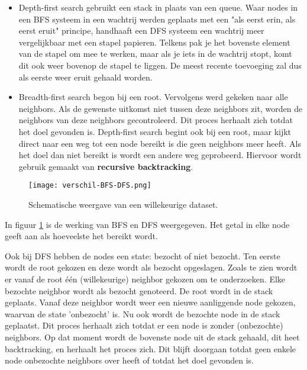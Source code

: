 \begin{itemize}
\item Depth-first search gebruikt een stack in plaats van een queue. Waar nodes in een BFS systeem in een wachtrij werden geplaats met een "als eerst erin, als eerst eruit" principe, handhaaft een DFS systeem een wachtrij meer vergelijkbaar met een stapel papieren. Telkens pak je het bovenste element van de stapel om mee te werken, maar als je iets in de wachtrij stopt, komt dit ook weer bovenop de stapel te liggen. De meest recente toevoeging zal dus als eerste weer eruit gehaald worden.
\item Breadth-first search begon bij een root. Vervolgens werd gekeken naar alle neighbors. Als de gewenste uitkomst niet tussen deze neighbors zit, worden de neighbors van deze neighbors gecontroleerd. Dit proces herhaalt zich totdat het doel gevonden is.
Depth-first search begint ook bij een root, maar kijkt direct naar een weg tot een node bereikt is die geen neighbors meer heeft. Als het doel dan niet bereikt is wordt een andere weg geprobeerd. Hiervoor wordt gebruik gemaakt van \textbf{recursive backtracking}.

\end{itemize}

\begin{figure}[H]
  \centering
    \texttt{[image: verschil-BFS-DFS.png]}
  \caption{Schematische weergave van een willekeurige dataset.}
  \label{fig:verschil-BFS-DFS}
\end{figure}

In figuur \ref{fig:verschil-BFS-DFS} is de werking van BFS en DFS weergegeven. Het getal in elke node geeft aan als hoeveelste het bereikt wordt. 

Ook bij DFS hebben de nodes een state: bezocht of niet bezocht.
Ten eerste wordt de root gekozen en deze wordt als bezocht opgeslagen. Zoals te zien wordt er vanaf de root \'e\'en (willekeurige) neighbor gekozen om te onderzoeken. Elke bezochte neighbor wordt als bezocht genoteerd. De root wordt in de stack geplaats. Vanaf deze neighbor wordt weer een nieuwe aanliggende node gekozen, waarvan de state 'onbezocht' is. Nu ook wordt de bezochte node in de stack geplaatst. Dit proces herhaalt zich totdat er een node is zonder (onbezochte) neighbors. Op dat moment wordt de bovenste node uit de stack gehaald, dit heet backtracking, en herhaalt het proces zich. Dit blijft doorgaan totdat geen enkele node onbezochte neighbors over heeft of totdat het doel gevonden is.

